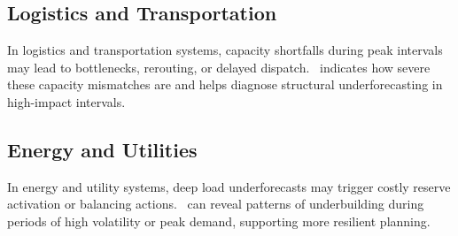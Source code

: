\subsection{Logistics and Transportation}

In logistics and transportation systems, capacity shortfalls during peak intervals
may lead to bottlenecks, rerouting, or delayed dispatch. \UD\ indicates how severe
these capacity mismatches are and helps diagnose structural underforecasting in
high-impact intervals.

\subsection{Energy and Utilities}

In energy and utility systems, deep load underforecasts may trigger costly reserve
activation or balancing actions. \UD\ can reveal patterns of underbuilding during
periods of high volatility or peak demand, supporting more resilient planning.
